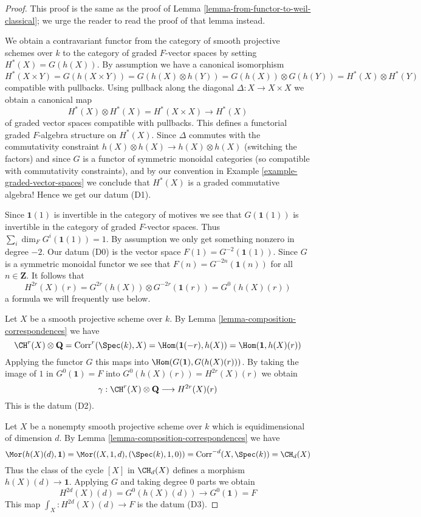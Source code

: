 \begin{proof}
This proof is the same as the proof of
Lemma \ref{lemma-from-functor-to-weil-classical};
we urge the reader to read the proof of that lemma instead.

\medskip\noindent
We obtain a contravariant functor from the category of smooth
projective schemes over $k$ to the category of graded $F$-vector spaces
by setting $H^*(X) = G(h(X))$. By assumption we have a canonical
isomorphism
$$
H^*(X \times Y) = G(h(X \times Y)) = G(h(X) \otimes h(Y)) =
G(h(X)) \otimes G(h(Y)) = H^*(X) \otimes H^*(Y)
$$
compatible with pullbacks. Using pullback along the diagonal
$\Delta : X \to X \times X$ we obtain a canonical map
$$
H^*(X) \otimes H^*(X) = H^*(X \times X) \to H^*(X)
$$
of graded vector spaces compatible with pullbacks.
This defines a functorial graded $F$-algebra structure on
$H^*(X)$. Since $\Delta$ commutes with the commutativity
constraint $h(X) \otimes h(X) \to h(X) \otimes h(X)$ (switching the factors)
and since $G$ is a functor of symmetric monoidal categories (so compatible with
commutativity constraints), and by our convention in
Example \ref{example-graded-vector-spaces}
we conclude that $H^*(X)$ is a graded
commutative algebra! Hence we get our datum (D1).

\medskip\noindent
Since $\mathbf{1}(1)$ is invertible in the category of motives
we see that $G(\mathbf{1}(1))$ is invertible in the category of
graded $F$-vector spaces. Thus $\sum_i \dim_F G^i(\mathbf{1}(1)) = 1$.
By assumption we only get something nonzero in degree $-2$.
Our datum (D0) is the vector space $F(1) = G^{-2}(\mathbf{1}(1))$.
Since $G$ is a symmetric monoidal functor we see that
$F(n) = G^{-2n}(\mathbf{1}(n))$ for all $n \in \mathbf{Z}$.
It follows that
$$
H^{2r}(X)(r) = G^{2r}(h(X)) \otimes G^{-2r}(\mathbf{1}(r)) =
G^0(h(X)(r))
$$
a formula we will frequently use below.

\medskip\noindent
Let $X$ be a smooth projective scheme over $k$. By
Lemma \ref{lemma-composition-correspondences} we have
$$
\CH^r(X) \otimes \mathbf{Q} = \text{Corr}^r(\Spec(k), X) =
\Hom(\mathbf{1}(-r), h(X)) = \Hom(\mathbf{1}, h(X)(r))
$$
Applying the functor $G$ this maps into
$\Hom(G(\mathbf{1}), G(h(X)(r)))$.
By taking the image of $1$ in $G^0(\mathbf{1}) = F$
into $G^0(h(X)(r)) = H^{2r}(X)(r)$ we obtain
$$
\gamma :
\CH^r(X) \otimes \mathbf{Q} \longrightarrow H^{2r}(X)(r)
$$
This is the datum (D2).

\medskip\noindent
Let $X$ be a nonempty smooth projective scheme over $k$
which is equidimensional of dimension $d$. By
Lemma \ref{lemma-composition-correspondences} we have
$$
\Mor(h(X)(d), \mathbf{1}) = \Mor((X, 1, d), (\Spec(k), 1, 0)) =
\text{Corr}^{-d}(X, \Spec(k)) = \CH_d(X)
$$
Thus the class of the cycle $[X]$ in $\CH_d(X)$ defines a morphism
$h(X)(d) \to \mathbf{1}$. Applying $G$ and taking degree $0$
parts we obtain
$$
H^{2d}(X)(d) = G^0(h(X)(d)) \longrightarrow G^0(\mathbf{1}) = F
$$
This map $\int_X : H^{2d}(X)(d) \to F$ is the datum (D3).


\end{proof}
